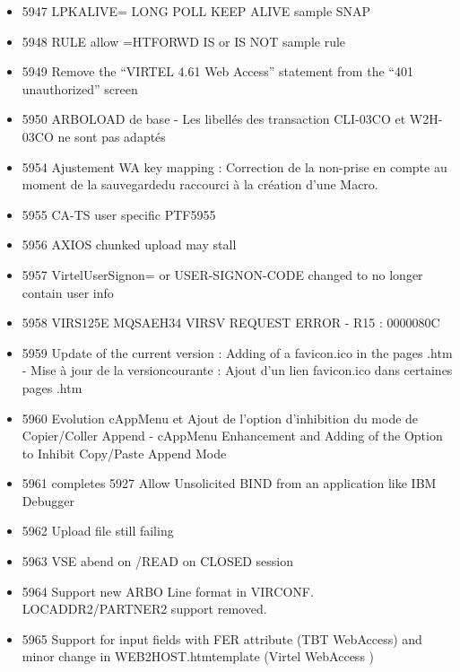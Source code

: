 \documentclass[letterpaper,10pt,english]{sphinxmanual}
\begin{document}
\begin{itemize}
\item {} 
5947 LPKALIVE=         LONG POLL KEEP ALIVE  sample SNAP

\item {} 
5948 RULE allow =HTFORWD IS or IS NOT sample rule

\item {} 
5949 Remove the “VIRTEL 4.61 Web Access” statement from the “401 unauthorized” screen

\item {} 
5950 ARBOLOAD de base - Les libellés des transaction CLI-03CO et W2H-03CO ne sont pas adaptés

\item {} 
5954 Ajustement WA key mapping : Correction de la non-prise en compte au moment de la sauvegardedu raccourci à la création d’une Macro.

\item {} 
5955 CA-TS user specific PTF5955

\item {} 
5956 AXIOS chunked upload may stall

\item {} 
5957 VirtelUserSignon= or USER-SIGNON-CODE changed to no longer contain user info

\item {} 
5958 VIRS125E MQSAEH34 VIRSV REQUEST ERROR - R15 : 0000080C

\item {} 
5959 Update of the current version : Adding of a favicon.ico in the pages .htm - Mise à jour de la versioncourante : Ajout d’un lien favicon.ico dans certaines pages .htm

\item {} 
5960 Evolution cAppMenu et Ajout de l’option d’inhibition du mode de Copier/Coller Append - cAppMenu Enhancement and Adding of the Option to Inhibit Copy/Paste Append Mode

\item {} 
5961 completes 5927 Allow Unsolicited BIND from an application like IBM Debugger

\item {} 
5962 Upload file still failing

\item {} 
5963 VSE abend on /READ on CLOSED session

\item {} 
5964 Support new ARBO Line format in VIRCONF. LOCADDR2/PARTNER2 support removed.

\item {} 
5965 Support for input fields with FER attribute (TBT WebAccess) and minor change in WEB2HOST.htmtemplate (Virtel WebAccess )


\end{itemize}
\end{document}
